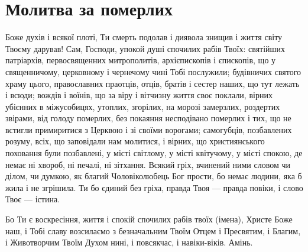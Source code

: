 \documentclass[chapters.tex]{subfiles}
\begin{document}
\section{Молитва за померлих}
Боже духів і всякої плоті, Ти смерть подолав і диявола знищив і життя світу Твоєму дарував! Сам, Господи, упокой душі спочилих рабів Твоїх: святійших патріархів, первосвященних митрополитів, архієпископів і єпископів, що у священничому, церковному і чернечому чині Тобі послужили; будівничих святого храму цього, православних праотців, отців, братів і сестер наших, що тут лежать і всюди; вождів і воїнів, що за віру і вітчизну життя своє поклали, вірних убієнних в міжусобицях, утоплих, згорілих, на морозі замерзлих, роздертих звірами, від голоду померлих, без покаяння несподівано померлих і тих, що не встигли примиритися з Церквою і зі своїми ворогами; самогубців, позбавлених розуму, всіх, що заповідали нам молитися, і вірних, що християнського поховання були позбавлені, у місті світлому, у місті квітучому, у місті спокою, де немає ні хвороб, ні печалі, ні зітхання. Всякий гріх, вчинений ними словом чи ділом, чи думкою, як благий Чоловіколюбець Бог прости, бо немає людини, яка б жила і не згрішила. Ти бо єдиний без гріха, правда Твоя — правда повіки, і слово Твоє — істина.

Бо Ти є воскресіння, життя і спокій спочилих рабів твоїх (імена), Христе Боже наш, і Тобі славу возсилаємо з безначальним Твоїм Отцем і Пресвятим, і Благим, і Животворчим Твоїм Духом нині, і повсякчас, і навіки-віків. Амінь.
\end{document}
